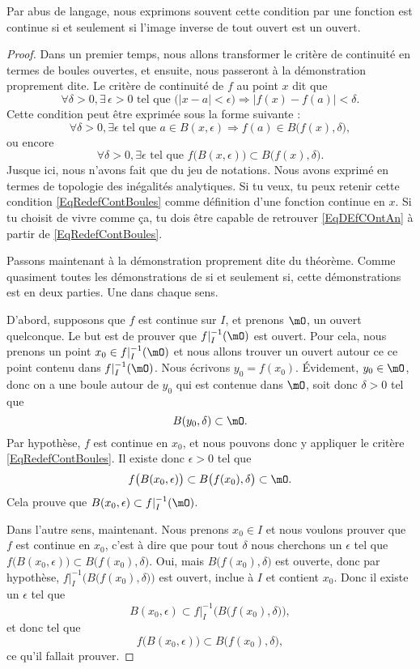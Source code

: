 \documentclass{article}
\begin{document}
Par abus de langage, nous exprimons souvent cette condition par \og une fonction est continue si et seulement si l'image inverse de tout ouvert est un ouvert\fg.

\begin{proof}

Dans un premier temps, nous allons transformer le critère de continuité en termes de boules ouvertes, et ensuite, nous passeront à la démonstration proprement dite. Le critère de continuité de $f$ au point $x$ dit que
\begin{equation}		\label{EqDEfCOntAn}
  \forall \delta>0,\exists\,\epsilon>0\text{ tel que }\big( | x-a |< \epsilon \big)\Rightarrow| f(x)-f(a) |<\delta.
\end{equation}
Cette condition peut être exprimée sous la forme suivante :
\[ 
  \forall \delta>0,\exists\epsilon\text{ tel que } a\in B(x,\epsilon)\Rightarrow f(a)\in B\big( f(x),\delta \big),
\]
ou encore
\begin{equation}		\label{EqRedefContBoules}
  \forall \delta>0,\exists\epsilon\text{ tel que } f\big( B(x,\epsilon) \big)\subset B\big( f(x),\delta \big).
\end{equation}
Jusque ici, nous n'avons fait que du jeu de notations. Nous avons exprimé en termes de topologie des inégalités analytiques. Si tu veux, tu peux retenir cette condition \eqref{EqRedefContBoules} comme définition d'une fonction continue en $x$. Si tu choisit de vivre comme ça, tu dois être capable de retrouver \eqref{EqDEfCOntAn} à partir de \eqref{EqRedefContBoules}.
 
Passons maintenant à la démonstration proprement dite du théorème. Comme quasiment toutes les démonstrations de \og si et seulement si\fg, cette démonstrations est en deux parties. Une dans chaque sens.

D'abord, supposons que $f$ est continue sur $I$, et prenons $\mO$, un ouvert quelconque. Le but est de prouver que $f|_I^{-1}(\mO)$ est ouvert. Pour cela, nous prenons un point $x_0\in f|_I^{-1}(\mO)$ et nous allons trouver un ouvert autour ce ce point contenu dans $f|_I^{-1}(\mO)$. Nous écrivons $y_0=f(x_0)$. Évidement, $y_0\in\mO$, donc on a une boule autour de $y_0$ qui est contenue dans $\mO$, soit donc $\delta>0$ tel que
\[  
  B(y_0,\delta)\subset\mO.
\]
Par hypothèse, $f$ est continue en $x_0$, et nous pouvons donc y appliquer le critère \eqref{EqRedefContBoules}. Il existe donc $\epsilon>0$ tel que 
\[ 
  f\big( B(x_0,\epsilon) \big)\subset B\big( f(x_0),\delta \big)\subset\mO.
\]
Cela prouve que $B(x_0,\epsilon)\subset f|_I^{-1}(\mO)$.

Dans l'autre sens, maintenant. Nous prenons $x_0\in I$ et nous voulons prouver que $f$ est continue en $x_0$, c'est à dire que pour tout $\delta$ nous cherchons un $\epsilon$ tel que $f\big( B(x_0,\epsilon) \big)\subset B\big( f(x_0),\delta \big)$. Oui, mais $B\big( f(x_0),\delta \big)$ est ouverte, donc par hypothèse, $f|_I^{-1}\Big( B\big( f(x_0),\delta \big) \Big)$ est ouvert, inclue à $I$ et contient $x_0$. Donc il existe un $\epsilon$ tel que
\[ 
  B(x_0,\epsilon)\subset f|_I^{-1}\Big( B\big( f(x_0),\delta \big) \Big),
\]
et donc tel que 
\[ 
  f\big( B(x_0,\epsilon) \big)\subset B\big( f(x_0),\delta \big),
\]
ce qu'il fallait prouver.
\end{proof}
\end{document}
